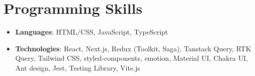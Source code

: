 \documentclass[letterpaper,11pt]{article}
\newcommand{\resumeSubHeadingListStart}{\begin{itemize}[leftmargin=*]}
\newcommand{\resumeSubHeadingListEnd}{\end{itemize}}
\begin{document}
    
    \section{Programming Skills}
    \resumeSubHeadingListStart
      
        \item{
          \textbf{Languages}{: HTML/CSS, JavaScript, TypeScript}
        }
      
        \item{
          \textbf{Technologies}{: React, Next.js, Redux (Toolkit, Saga), Tanstack Query, RTK Query, Tailwind CSS, styled-components, emotion, Material UI, Chakra UI, Ant design, Jest, Testing Library, Vite.js}
        }
      
    \resumeSubHeadingListEnd
  
    
\end{document}
